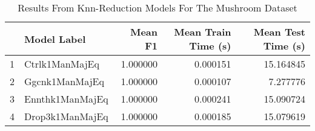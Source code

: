 \begin{table}
\centering
\caption{Results From Knn-Reduction Models For The Mushroom Dataset}
\label{tab:knn_reduction_results_mushroom}
\begin{tabular}{rlrrr}
\toprule
 & Model Label & Mean F1 & Mean Train Time (s) & Mean Test Time (s) \\
\midrule
1 & Ctrlk1ManMajEq & 1.000000 & 0.000151 & 15.164845 \\
2 & Ggcnk1ManMajEq & 1.000000 & 0.000107 & 7.277776 \\
3 & Ennthk1ManMajEq & 1.000000 & 0.000241 & 15.090724 \\
4 & Drop3k1ManMajEq & 1.000000 & 0.000185 & 15.079619 \\
\bottomrule
\end{tabular}
\end{table}

